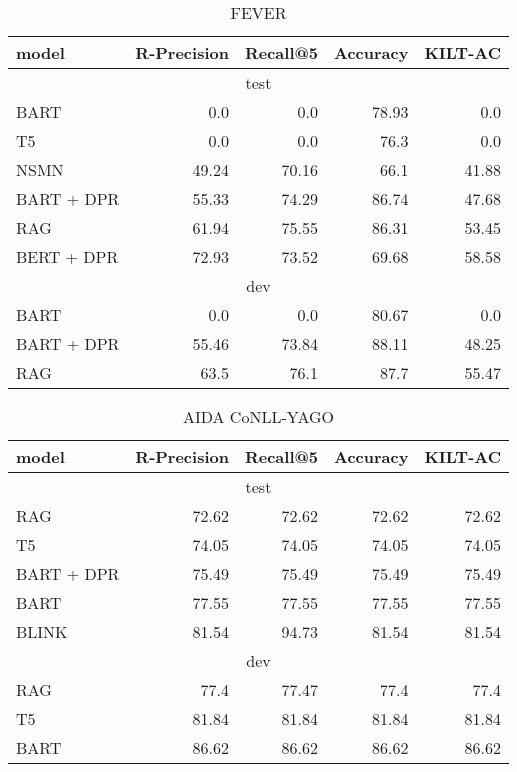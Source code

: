 \documentclass[11pt]{article}
\begin{document}
\begin{table*}[ht]
\centering
\begin{tabular}{l@{\hskip 2em}rrrr}
 \toprule
model & \textbf{R-Precision} & \textbf{Recall@5} & \textbf{Accuracy}  & \textbf{KILT-AC}  \\
\midrule
\multicolumn{5}{c}{test} \\
\midrule
BART & 0.0 & 0.0 & 78.93 & 0.0 \\ 
T5 & 0.0 & 0.0 & 76.3 & 0.0 \\ 
NSMN & 49.24 & 70.16 & 66.1 & 41.88 \\ 
BART + DPR & 55.33 & 74.29 & 86.74 & 47.68 \\ 
RAG & 61.94 & 75.55 & 86.31 & 53.45 \\ 
BERT + DPR & 72.93 & 73.52 & 69.68 & 58.58 \\ 
\midrule
\multicolumn{5}{c}{dev} \\
\midrule
BART & 0.0 & 0.0 & 80.67 & 0.0 \\ 
BART + DPR & 55.46 & 73.84 & 88.11 & 48.25 \\ 
RAG & 63.5 & 76.1 & 87.7 & 55.47 \\ 
\bottomrule
\end{tabular}
\caption{FEVER}
\label{tab:FEV}
\end{table*}
 \begin{table*}[ht]
\centering
\begin{tabular}{l@{\hskip 2em}rrrr}
 \toprule
model & \textbf{R-Precision} & \textbf{Recall@5} & \textbf{Accuracy}  & \textbf{KILT-AC}  \\
\midrule
\multicolumn{5}{c}{test} \\
\midrule
RAG & 72.62 & 72.62 & 72.62 & 72.62 \\ 
T5 & 74.05 & 74.05 & 74.05 & 74.05 \\ 
BART + DPR & 75.49 & 75.49 & 75.49 & 75.49 \\ 
BART & 77.55 & 77.55 & 77.55 & 77.55 \\ 
BLINK & 81.54 & 94.73 & 81.54 & 81.54 \\ 
\midrule
\multicolumn{5}{c}{dev} \\
\midrule
RAG & 77.4 & 77.47 & 77.4 & 77.4 \\ 
T5 & 81.84 & 81.84 & 81.84 & 81.84 \\ 
BART & 86.62 & 86.62 & 86.62 & 86.62 \\ 
\bottomrule
\end{tabular}
\caption{AIDA CoNLL-YAGO}
\label{tab:AY2}
\end{table*}
\end{document}
